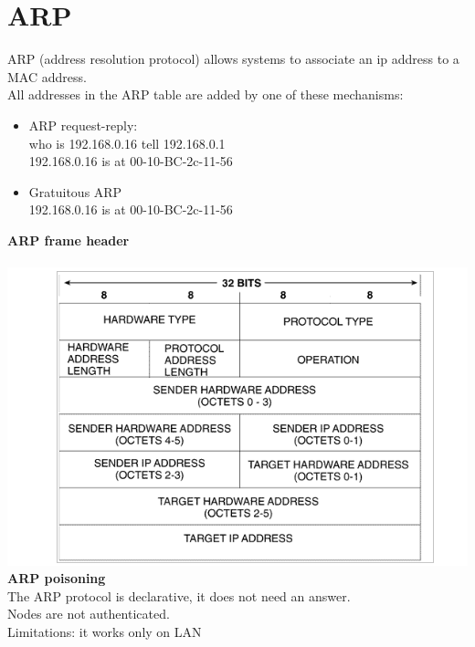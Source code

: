 \documentclass[10pt,a4paper]{book}
\begin{document}
\section{ARP}
ARP (address resolution protocol) allows systems to associate an ip address to a MAC address.\\
All addresses in the ARP table are added by one of these mechanisms:
\begin{itemize}
\item ARP request-reply: \\
who is 192.168.0.16 tell 192.168.0.1\\
192.168.0.16 is at 00-10-BC-2c-11-56
\item Gratuitous ARP\\
192.168.0.16 is at 00-10-BC-2c-11-56
\end{itemize}
\textbf{ARP frame header}\\\\
\includegraphics[scale=0.6]{img/arp.png}\\
\textbf{ARP poisoning}\\
The ARP protocol is declarative, it does not need an answer.\\
Nodes are not authenticated.\\
Limitations: it works only on LAN\\\\
\newpage
\end{document}
